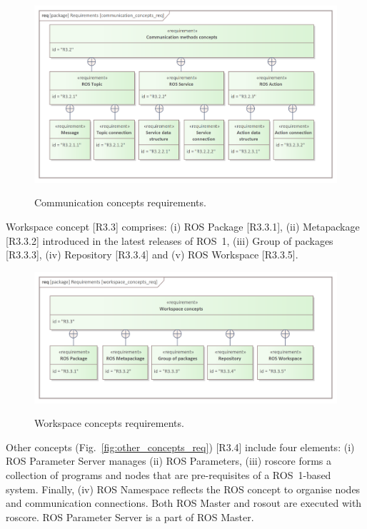 \begin{figure}[H]
	\centering
	\begin{center}
	{\includegraphics[scale=1]{../imgs/requirement_pkg/communication_concepts_req.png}}
	\end{center}
	\caption{Communication concepts requirements.}
	\label{fig:communication_concepts_req}
\end{figure}
Workspace concept [R3.3] comprises: (i) ROS Package [R3.3.1], (ii) Metapackage [R3.3.2] introduced in the latest releases of ROS~1, (iii) Group of packages [R3.3.3], (iv) Repository [R3.3.4] and (v) ROS Workspace [R3.3.5].

\begin{figure}[H]
	\centering
	\begin{center}
	{\includegraphics[scale=1]{../imgs/requirement_pkg/workspace_concepts_req.png}}
	\end{center}
	\caption{Workspace concepts requirements.}
	\label{fig:workspace_concepts_req}
\end{figure}

\pagebreak

Other concepts (Fig.~\ref{fig:other_concepts_req}) [R3.4] include four elements: (i) ROS Parameter Server manages (ii) ROS Parameters, (iii) roscore forms a collection of programs and nodes that are pre-requisites of a ROS~1-based system. Finally, (iv) ROS Namespace reflects the ROS concept to organise nodes and communication connections. Both ROS Master and rosout are executed with roscore. ROS Parameter Server is a part of ROS Master.

